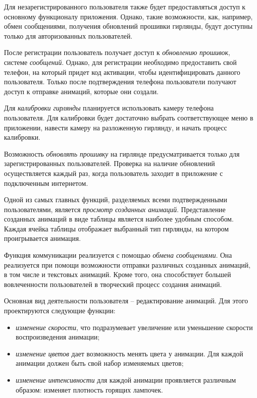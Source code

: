 Для незарегистрированного пользователя также будет предоставляться доступ к основному функционалу приложения. Однако, такие возможности, как, например, обмен сообщениями, получения обновлений прошивки гирлянды, будут доступны только для авторизованных пользователей. 

После регистрации пользователь получает доступ к \emph{обновлению прошивок}, системе \emph{сообщений}. Однако, для регистрации необходимо предоставить свой телефон, на который придет код активации, чтобы идентифицировать данного пользователя. Только после подтверждения телефона пользователи получают доступ к отправке анимаций, которые они создали. 

Для \emph{калибровки гирлянды} планируется использовать камеру телефона пользователя. Для калибровки будет достаточно выбрать соответствующее меню в приложении, навести камеру на разложенную гирлянду, и начать процесс калибровки.  

Возможность \emph{обновлять прошивку} на гирлянде предусматривается только для зарегистрированных пользователей. Проверка на наличие обновлений осуществляется каждый раз, когда пользователь заходит в приложение с подключенным интернетом.

Одной из самых главных функций, разделяемых всеми подтвержденными пользователями, является \emph{просмотр созданных анимаций}. Представление созданных анимаций в виде таблицы является наиболее удобным способом. Каждая ячейка таблицы отображает выбранный тип гирлянды, на котором проигрывается анимация. 

Функция коммуникации реализуется с помощью \emph{обмена сообщениями}. Она реализуется при помощи возможности отправки различных созданных анимаций, в том числе и текстовых анимаций. Кроме того, она способствует большей вовлеченности пользователей в творческий процесс создания анимаций.

Основная вид деятельности пользователя -- редактирование анимаций. Для этого проектируются следующие функции:

\begin{itemize}
	\item \emph{изменение скорости}, что подразумевает увеличение или уменьшение скорости воспроизведения анимации;
	\item \emph{изменение цветов} дает возможность менять цвета у анимации. Для каждой анимации должен быть свой набор изменяемых цветов;
	\item \emph{изменение интенсивности} для каждой анимации проявляется различным образом: изменяет плотность горящих лампочек.
\end{itemize}

